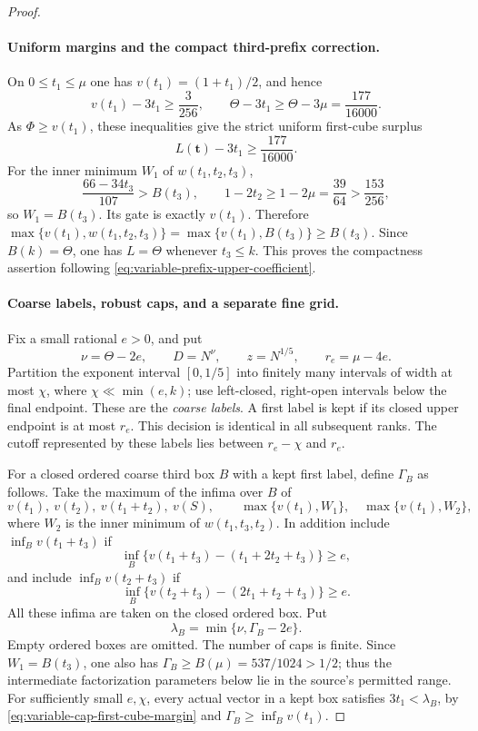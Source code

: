\documentclass[11pt]{article}
\begin{document}
\begin{proof}
\paragraph{Uniform margins and the compact third-prefix correction.}
On $0\le t_1\le\mu$ one has $v(t_1)=(1+t_1)/2$, and hence
\[
 v(t_1)-3t_1\ge\frac3{256},\qquad
 \Theta-3t_1\ge\Theta-3\mu=\frac{177}{16000}.
\]
As $\Phi\ge v(t_1)$, these inequalities give the strict uniform
first-cube surplus
\begin{equation}\label{eq:variable-cap-first-cube-margin}
 L(\boldsymbol t)-3t_1\ge\frac{177}{16000}.
\end{equation}
For the inner minimum $W_1$ of $w(t_1,t_2,t_3)$,
\[
 \frac{66-34t_3}{107}>B(t_3),\qquad
 1-2t_2\ge1-2\mu=\frac{39}{64}>\frac{153}{256},
\]
so $W_1=B(t_3)$. Its gate is exactly $v(t_1)$.
Therefore $\max\{v(t_1),w(t_1,t_2,t_3)\}
=\max\{v(t_1),B(t_3)\}\ge B(t_3)$.
Since $B(k)=\Theta$, one has $L=\Theta$ whenever $t_3\le k$.
This proves the compactness assertion following
\eqref{eq:variable-prefix-upper-coefficient}.

\paragraph{Coarse labels, robust caps, and a separate fine grid.}
Fix a small rational $e>0$, and put
\[
 \nu=\Theta-2e,\qquad D=N^\nu,\qquad z=N^{1/5},\qquad
 r_e=\mu-4e.
\]
Partition the exponent interval $[0,1/5]$ into finitely many
intervals of width at most $\chi$, where
$\chi\ll\min(e,k)$; use left-closed, right-open intervals below
the final endpoint. These are the \emph{coarse labels}.
A first label is kept if its closed upper endpoint is at most
$r_e$. This decision is identical in all subsequent ranks.
The cutoff represented by these labels lies between
$r_e-\chi$ and $r_e$.

For a closed ordered coarse third box $B$ with a kept first label,
define $\Gamma_B$ as follows. Take the maximum of the infima over
$B$ of
\[
 v(t_1),\ v(t_2),\ v(t_1+t_2),\ v(S),\qquad
 \max\{v(t_1),W_1\},\quad\max\{v(t_1),W_2\},
\]
where $W_2$ is the inner minimum of $w(t_1,t_3,t_2)$.
In addition include $\inf_B v(t_1+t_3)$ if
\[
 \inf_B\{v(t_1+t_3)-(t_1+2t_2+t_3)\}\ge e,
\]
and include $\inf_B v(t_2+t_3)$ if
\[
 \inf_B\{v(t_2+t_3)-(2t_1+t_2+t_3)\}\ge e.
\]
All these infima are taken on the closed ordered box. Put
\begin{equation}\label{eq:variable-prefix-coarse-cap}
 \lambda_B=\min\{\nu,\Gamma_B-2e\}.
\end{equation}
Empty ordered boxes are omitted. The number of caps is finite.
Since $W_1=B(t_3)$, one also has
$\Gamma_B\ge B(\mu)=537/1024>1/2$; thus the intermediate
factorization parameters below lie in the source's permitted range.
For sufficiently small $e,\chi$, every actual vector in a kept
box satisfies $3t_1<\lambda_B$, by
\eqref{eq:variable-cap-first-cube-margin} and
$\Gamma_B\ge\inf_Bv(t_1)$.


\end{proof}
\end{document}

